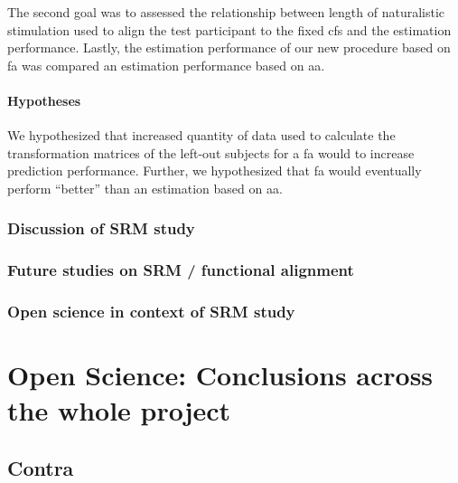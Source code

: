 The second goal was to assessed the relationship between length of
naturalistic stimulation used to align the test participant to the fixed
\ac{cfs} and the estimation performance.
%
Lastly, the estimation performance of our new procedure based on \ac{fa} was
compared an estimation performance based on \ac{aa}.


\paragraph{Hypotheses}
%
We hypothesized that increased quantity of data used to calculate the
transformation matrices of the left-out subjects for a \ac{fa} would to increase
prediction performance.
%
Further, we hypothesized that \ac{fa} would eventually perform
``better'' than an estimation based on \ac{aa}.



\subsubsection{Discussion of SRM study}




\subsubsection{Future studies on SRM / functional alignment}




\subsubsection{Open science in context of SRM study}








\section{Open Science: Conclusions across the whole project}


\subsection{Contra}

